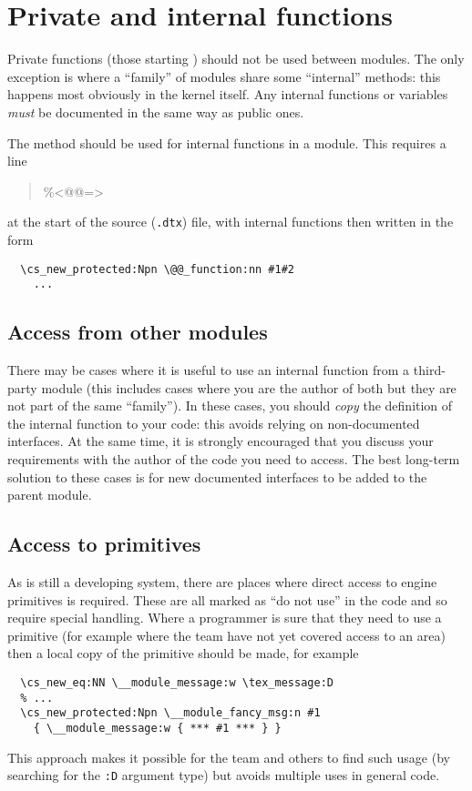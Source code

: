 \documentclass{l3doc}
\begin{document}
\section{Private and internal functions}

Private functions (those starting \cs{__}) should not be used between modules.
The only exception is where a \enquote{family} of modules share some
\enquote{internal} methods: this happens most obviously in the kernel itself.
Any internal functions or variables \emph{must} be documented in the same way
as public ones.

The  method should be used for internal functions in a module.
This requires a line
\begin{quote}
  \ttfamily
  \%<@@=>
\end{quote}
at the start of the source (\texttt{.dtx}) file, with internal functions
then written in the form
\begin{verbatim}
  \cs_new_protected:Npn \@@_function:nn #1#2
    ...
\end{verbatim}

\subsection{Access from other modules}

There may be cases where it is useful to use an internal function from
a third-party module (this includes cases where you are the author of both
but they are not part of the same \enquote{family}). In these cases, you should
\emph{copy} the definition of the internal function to your code: this avoids
relying on non-documented interfaces. At the same time, it is strongly
encouraged that you discuss your requirements with the author of the
code you need to access. The best long-term solution to these cases is for
new documented interfaces to be added to the parent module.

\subsection{Access to primitives}

As  is still a developing system, there are places where direct
access to engine primitives is required. These are all marked as
\enquote{do not use} in the code and so require special handling. Where a
programmer is sure that they need to use a primitive (for example where the
team have not yet covered access to an area) then a local copy of the
primitive should be made, for example
\begin{verbatim}
  \cs_new_eq:NN \__module_message:w \tex_message:D
  % ...
  \cs_new_protected:Npn \__module_fancy_msg:n #1
    { \__module_message:w { *** #1 *** } }
\end{verbatim}
This approach makes it possible for the team and others to find such
usage (by searching for the \texttt{:D} argument type) but avoids
multiple uses in general code.
\end{document}

